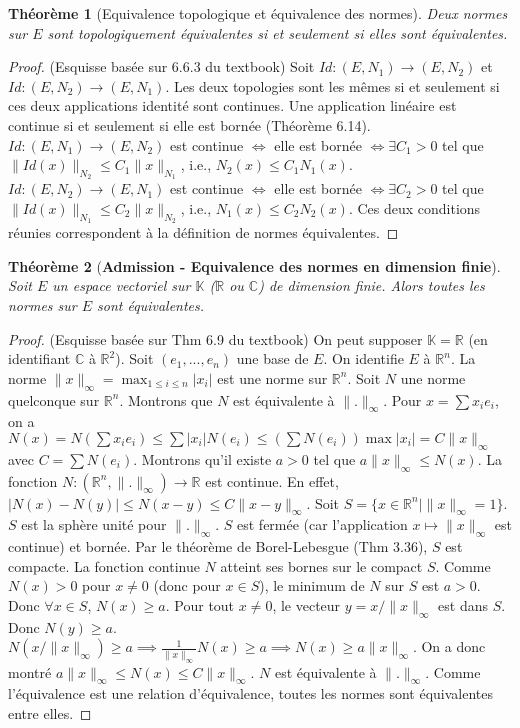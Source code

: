 \documentclass{article}
\newtheorem{theorem}{Théorème} %
\theoremstyle{definition} %
\begin{document}
\begin{theorem}[Equivalence topologique et équivalence des normes]
Deux normes sur $E$ sont topologiquement équivalentes si et seulement si elles sont équivalentes.
\end{theorem}
\begin{proof} (Esquisse basée sur 6.6.3 du textbook)
Soit $Id: (E, N_1) \to (E, N_2)$ et $Id: (E, N_2) \to (E, N_1)$.
Les deux topologies sont les mêmes si et seulement si ces deux applications identité sont continues.
Une application linéaire est continue si et seulement si elle est bornée (Théorème 6.14).
$Id: (E, N_1) \to (E, N_2)$ est continue $\iff$ elle est bornée $\iff \exists C_1 > 0$ tel que $\|Id(x)\|_{N_2} \le C_1 \|x\|_{N_1}$, i.e., $N_2(x) \le C_1 N_1(x)$.
$Id: (E, N_2) \to (E, N_1)$ est continue $\iff$ elle est bornée $\iff \exists C_2 > 0$ tel que $\|Id(x)\|_{N_1} \le C_2 \|x\|_{N_2}$, i.e., $N_1(x) \le C_2 N_2(x)$.
Ces deux conditions réunies correspondent à la définition de normes équivalentes.
\end{proof}

\begin{theorem}[\textbf{Admission - Equivalence des normes en dimension finie}]
Soit $E$ un espace vectoriel sur $\mathbb{K}$ ($\mathbb{R}$ ou $\mathbb{C}$) de dimension finie. Alors toutes les normes sur $E$ sont équivalentes.
\end{theorem}
\begin{proof} (Esquisse basée sur Thm 6.9 du textbook)
On peut supposer $\mathbb{K} = \mathbb{R}$ (en identifiant $\mathbb{C}$ à $\mathbb{R}^2$).
Soit $(e_1, ..., e_n)$ une base de $E$. On identifie $E$ à $\mathbb{R}^n$.
La norme $\|x\|_\infty = \max_{1\le i \le n} |x_i|$ est une norme sur $\mathbb{R}^n$.
Soit $N$ une norme quelconque sur $\mathbb{R}^n$. Montrons que $N$ est équivalente à $\|.\|_\infty$.
Pour $x = \sum x_i e_i$, on a
$N(x) = N(\sum x_i e_i) \le \sum |x_i| N(e_i) \le (\sum N(e_i)) \max |x_i| = C \|x\|_\infty$ avec $C = \sum N(e_i)$.
Montrons qu'il existe $a > 0$ tel que $a \|x\|_\infty \le N(x)$.
La fonction $N: (\mathbb{R}^n, \|.\|_\infty) \to \mathbb{R}$ est continue.
En effet, $|N(x) - N(y)| \le N(x-y) \le C \|x-y\|_\infty$.
Soit $S = \{ x \in \mathbb{R}^n \mid \|x\|_\infty = 1 \}$. $S$ est la sphère unité pour $\|.\|_\infty$.
$S$ est fermée (car l'application $x \mapsto \|x\|_\infty$ est continue) et bornée.
Par le théorème de Borel-Lebesgue (Thm 3.36), $S$ est compacte.
La fonction continue $N$ atteint ses bornes sur le compact $S$.
Comme $N(x) > 0$ pour $x \ne 0$ (donc pour $x \in S$), le minimum de $N$ sur $S$ est $a > 0$.
Donc $\forall x \in S$, $N(x) \ge a$.
Pour tout $x \ne 0$, le vecteur $y = x / \|x\|_\infty$ est dans $S$.
Donc $N(y) \ge a$.
$N(x / \|x\|_\infty) \ge a \implies \frac{1}{\|x\|_\infty} N(x) \ge a \implies N(x) \ge a \|x\|_\infty$.
On a donc montré $a \|x\|_\infty \le N(x) \le C \|x\|_\infty$. $N$ est équivalente à $\|.\|_\infty$.
Comme l'équivalence est une relation d'équivalence, toutes les normes sont équivalentes entre elles.
\end{proof}
\end{document}
